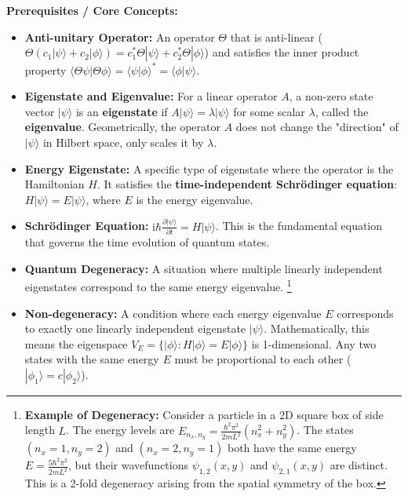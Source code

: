 \begin{solution}
\textbf{Prerequisites / Core Concepts:}
\begin{itemize}
    \item \textbf{Anti-unitary Operator:} An operator $\Theta$ that is anti-linear ($\Theta(c_1|\psi\rangle + c_2|\phi\rangle) = c_1^*\Theta|\psi\rangle + c_2^*\Theta|\phi\rangle$) and satisfies the inner product property $\langle \Theta \psi | \Theta \phi \rangle = \langle \psi | \phi \rangle^* = \langle \phi | \psi \rangle$.
    \item \textbf{Eigenstate and Eigenvalue:} For a linear operator $A$, a non-zero state vector $|\psi\rangle$ is an \textbf{eigenstate} if $A|\psi\rangle = \lambda |\psi\rangle$ for some scalar $\lambda$, called the \textbf{eigenvalue}. Geometrically, the operator $A$ does not change the "direction" of $|\psi\rangle$ in Hilbert space, only scales it by $\lambda$.
    \item \textbf{Energy Eigenstate:} A specific type of eigenstate where the operator is the Hamiltonian $H$. It satisfies the \textbf{time-independent Schrödinger equation}: $H|\psi\rangle = E|\psi\rangle$, where $E$ is the energy eigenvalue.
    \item \textbf{Schrödinger Equation:} $\mathrm{i}\hbar \frac{\partial |\psi\rangle}{\partial t} = H|\psi\rangle$. This is the fundamental equation that governs the time evolution of quantum states.
    \item \textbf{Quantum Degeneracy:} A situation where multiple linearly independent eigenstates correspond to the same energy eigenvalue. \footnote{\textbf{Example of Degeneracy:} Consider a particle in a 2D square box of side length $L$. The energy levels are $E_{n_x, n_y} = \frac{\hbar^2 \pi^2}{2m L^2} (n_x^2 + n_y^2)$. The states $(n_x=1, n_y=2)$ and $(n_x=2, n_y=1)$ both have the same energy $E = \frac{5\hbar^2 \pi^2}{2m L^2}$, but their wavefunctions $\psi_{1,2}(x,y)$ and $\psi_{2,1}(x,y)$ are distinct. This is a 2-fold degeneracy arising from the spatial symmetry of the box.}
    \item \textbf{Non-degeneracy:} A condition where each energy eigenvalue $E$ corresponds to exactly one linearly independent eigenstate $|\psi\rangle$. Mathematically, this means the eigenspace $V_E = \{ |\phi\rangle : H|\phi\rangle = E|\phi\rangle \}$ is 1-dimensional. Any two states with the same energy $E$ must be proportional to each other ($|\phi_1\rangle = c |\phi_2\rangle$).
\end{itemize}


\end{solution}
